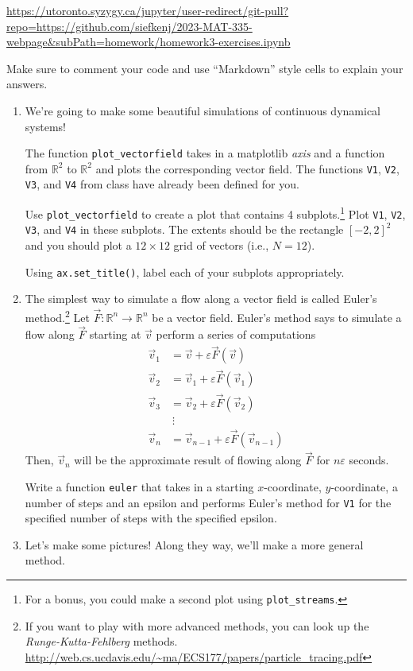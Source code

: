 \documentclass[letter]{article}
\newcommand{\R}{\mathbb{R}}
\begin{document}
	\url{https://utoronto.syzygy.ca/jupyter/user-redirect/git-pull?repo=https://github.com/siefkenj/2023-MAT-335-webpage&subPath=homework/homework3-exercises.ipynb}

	Make sure to comment your code and use ``Markdown'' style cells to explain your answers.

	\begin{enumerate}
		\item We're going to make some beautiful simulations of continuous dynamical systems!

			The function \verb|plot_vectorfield| takes in a matplotlib \emph{axis} and a function from $\R^2$ to $\R^2$
			and plots the corresponding vector field. The functions {\tt V1}, {\tt V2}, {\tt V3}, and {\tt V4} from class
			have already been defined for you.

			Use \verb|plot_vectorfield| to create a plot that contains 4 subplots.\footnote{
				For a bonus, you could make a second plot using {\tt plot\_streams}.} Plot {\tt V1}, {\tt V2}, {\tt V3}, and {\tt V4}
			in these subplots. The extents should be the rectangle $[-2,2]^2$ and you should plot a $12\times 12$ grid of vectors
			(i.e., $N=12$).

			Using \verb|ax.set_title()|, label each of your subplots appropriately.
		\item The simplest way to simulate a flow along a vector field is called Euler's method.\footnote{If you want to play with more advanced
			methods, you can look up the \emph{Runge-Kutta-Fehlberg} methods. \url{http://web.cs.ucdavis.edu/~ma/ECS177/papers/particle_tracing.pdf}}
			Let $\vec F:\R^n\to\R^n$ be a vector field. Euler's method says to simulate a flow along $\vec F$ starting at $\vec v$
			perform a series of computations
			\begin{align*}
				\vec v_1 &= \vec v + \varepsilon \vec F(\vec v)\\
				\vec v_2 &= \vec v_1 + \varepsilon \vec F(\vec v_1)\\
				\vec v_3 &= \vec v_2 + \varepsilon \vec F(\vec v_2)\\
				&~\vdots\\
				\vec v_n &= \vec v_{n-1} + \varepsilon \vec F(\vec v_{n-1})
			\end{align*}
			Then, $\vec v_n$ will be the approximate result of flowing along $\vec F$ for $n\varepsilon$ seconds.

			Write a function {\tt euler} that takes in a starting $x$-coordinate, $y$-coordinate, a number of steps and an epsilon
			and performs Euler's method for {\tt V1} for the specified number of steps with the specified epsilon.
		\item Let's make some pictures! Along they way, we'll make a more general method.


\end{enumerate}
\end{document}
